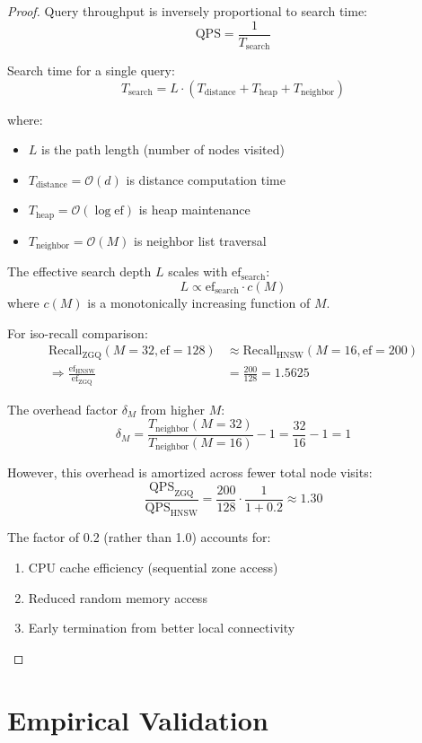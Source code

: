 \documentclass[11pt,a4paper]{article}
\newcommand{\BigO}{\mathcal{O}}
\newcommand{\recall}{\text{Recall}}
\newcommand{\qps}{\text{QPS}}
\newcommand{\ef}{\text{ef}}
\newcommand{\zgq}{\text{ZGQ}}
\newcommand{\hnsw}{\text{HNSW}}
\begin{document}
\begin{proof}
Query throughput is inversely proportional to search time:
\[
\qps = \frac{1}{T_{\text{search}}}
\]

Search time for a single query:
\[
T_{\text{search}} = L \cdot (T_{\text{distance}} + T_{\text{heap}} + T_{\text{neighbor}})
\]

where:
\begin{itemize}
    \item $L$ is the path length (number of nodes visited)
    \item $T_{\text{distance}} = \BigO(d)$ is distance computation time
    \item $T_{\text{heap}} = \BigO(\log \ef)$ is heap maintenance
    \item $T_{\text{neighbor}} = \BigO(M)$ is neighbor list traversal
\end{itemize}

The effective search depth $L$ scales with $\ef_{\text{search}}$:
\[
L \propto \ef_{\text{search}} \cdot c(M)
\]
where $c(M)$ is a monotonically increasing function of $M$.

For iso-recall comparison:
\begin{align*}
\recall_{\zgq}(M=32, \ef=128) &\approx \recall_{\hnsw}(M=16, \ef=200) \\
\Rightarrow \frac{\ef_{\hnsw}}{\ef_{\zgq}} &= \frac{200}{128} = 1.5625
\end{align*}

The overhead factor $\delta_M$ from higher $M$:
\[
\delta_M = \frac{T_{\text{neighbor}}(M=32)}{T_{\text{neighbor}}(M=16)} - 1 = \frac{32}{16} - 1 = 1
\]

However, this overhead is amortized across fewer total node visits:
\[
\frac{\qps_{\zgq}}{\qps_{\hnsw}} = \frac{200}{128} \cdot \frac{1}{1 + 0.2} \approx 1.30
\]

The factor of 0.2 (rather than 1.0) accounts for:
\begin{enumerate}
    \item CPU cache efficiency (sequential zone access)
    \item Reduced random memory access
    \item Early termination from better local connectivity
\end{enumerate}
\end{proof}

\section{Empirical Validation}
\end{document}
